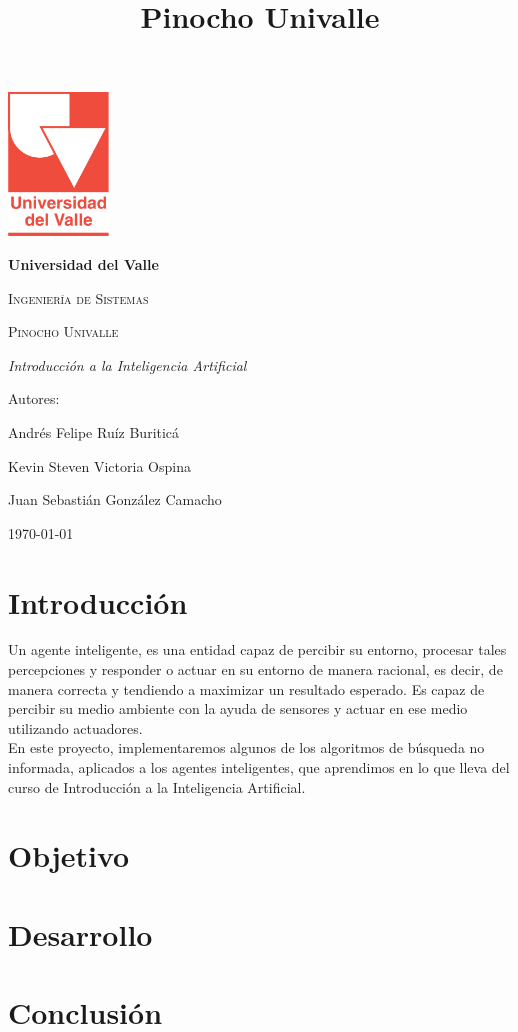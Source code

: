 \documentclass{article}
\title{Pinocho Univalle}
\begin{document}
\begin{titlepage}
\centering
{\includegraphics[width=0.2\textwidth]{images/logo.png}\par}
\vspace{1cm}
{\bfseries\LARGE Universidad del Valle \par}
\vspace{1cm}
{\scshape\Large Ingeniería de Sistemas \par}
\vfill
{\scshape\Huge Pinocho Univalle \par}
\vfill
{\itshape\Large Introducción a la Inteligencia Artificial \par}
\vfill
{\Large Autores: \par}
{\Large Andrés Felipe Ruíz Buriticá \par}
{\Large Kevin Steven Victoria Ospina \par}
{\Large Juan Sebastián González Camacho \par}
\vfill
{\Large \today \par}
\end{titlepage}
\tableofcontents
\clearpage
\section{Introducción}
Un agente inteligente, es una entidad capaz de percibir su entorno, procesar tales percepciones y responder o actuar en su entorno de manera racional, es decir, de manera correcta y tendiendo a maximizar un resultado esperado. Es capaz de percibir su medio ambiente con la ayuda de sensores y actuar en ese medio utilizando actuadores.
\newline \\
En este proyecto, implementaremos algunos de los algoritmos de búsqueda no informada, aplicados a los agentes inteligentes, que aprendimos en lo que lleva del curso de Introducción a la Inteligencia Artificial.
\clearpage
\section{Objetivo}
\clearpage
\section{Desarrollo}
\clearpage
\section{Conclusión}
\clearpage
\end{document}
